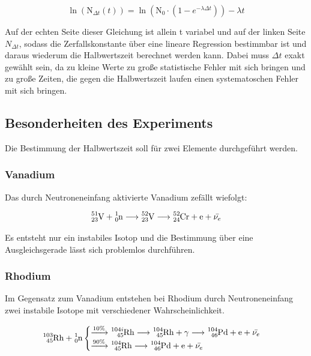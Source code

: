 \documentclass[titlepage = firstcover]{scrartcl}
\begin{document}
            \begin{equation}
                \ln\left(\text{N}_{\Delta t}(t)\right) = \ln \left(\text{N}_0 \cdot \left(1 - e^{-\lambda \Delta t}\right)\right) - \lambda t
                \label{eqn:theorieGerade}
            \end{equation}
            
            \noindent
            Auf der echten Seite dieser Gleichung ist allein t variabel und auf der linken Seite $N_{\Delta t}$, sodass die Zerfallskonstante über eine lineare Regression bestimmbar ist und daraus 
            wiederum die Halbwertszeit berechnet werden kann. Dabei muss
            $\Delta t$ exakt gewählt sein, da zu kleine Werte zu große statistische Fehler mit sich bringen und zu große Zeiten, die gegen die Halbwertszeit laufen einen systematoschen Fehler mit
            sich bringen.

        \subsection{Besonderheiten des Experiments}
            Die Bestimmung der Halbwertszeit soll für zwei Elemente durchgeführt werden.

                \subsubsection*{Vanadium}
                Das durch Neutroneneinfang aktivierte Vanadium zefällt wiefolgt:

                \begin{equation*}
                    \ce{^{51}_{23}V} + \ce{^{1}_{0}n} \longrightarrow \ce{^{52}_{23}V}  \longrightarrow \ce{^{52}_{24}Cr} + \text{e} + \bar{\nu_e}
                \end{equation*}

                \noindent 
                Es entsteht nur ein instabiles Isotop und die Bestimmung über eine Ausgleichsgerade lässt sich problemlos durchführen.
                
                \subsubsection*{Rhodium}
                Im Gegensatz zum Vanadium entstehen bei Rhodium durch Neutroneneinfang zwei instabile Isotope mit verschiedener Wahrscheinlichkeit.

                \begin{equation}
                    \ce{^{103}_{45}Rh} + \ce{^{1}_{0}n}  \begin{cases}
                        \xrightarrow{10\%} \ce{^{104i}_{45}Rh} \longrightarrow \ce{^{104}_{45}Rh} + \gamma \longrightarrow \ce{^{104}_{46}Pd} + \text{e} + \bar{\nu_e} \\
                        \xrightarrow{90\%} \ce{^{104}_{45}Rh} \longrightarrow \ce{^{104}_{46}Pd} + \text{e} + \bar{\nu_e}
                    \end{cases}
                    \label{eqn:Rhodium}
                \end{equation}
\end{document}
